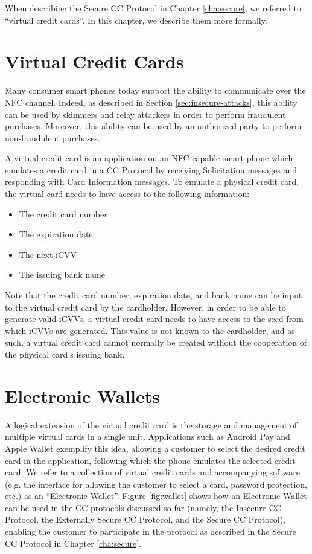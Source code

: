 When describing the Secure CC Protocol in Chapter \ref{cha:secure}, we referred to ``virtual credit cards''.
In this chapter, we describe them more formally.

\section{Virtual Credit Cards}

Many consumer smart phones today support the ability to communicate over the NFC channel.
Indeed, as described in Section \ref{sec:insecure-attacks}, this ability can be used by skimmers and relay attackers in order to perform fraudulent purchases.
Moreover, this ability can be used by an authorized party to perform non-fraudulent purchases.

A virtual credit card is an application on an NFC-capable smart phone which emulates a credit card in a CC Protocol
    by receiving Solicitation messages and responding with Card Information messages.
To emulate a physical credit card, the virtual card needs to have access to the following information:

\begin{itemize}
\item The credit card number
\item The expiration date
\item The next iCVV
\item The issuing bank name
\end{itemize}

Note that the credit card number, expiration date, and bank name can be input to the virtual credit card by the cardholder.
However, in order to be able to generate valid iCVVs, a virtual credit card needs to have access to the seed from which iCVVs are generated.
This value is not known to the cardholder, and as such, a virtual credit card cannot normally be created without the cooperation of the physical card's issuing bank.


\section{Electronic Wallets}
A logical extension of the virtual credit card is the storage and management of multiple virtual cards in a single unit.
Applications such as Android Pay and Apple Wallet exemplify this idea,
    allowing a customer to select the desired credit card in the application,
    following which the phone emulates the selected credit card.
We refer to a collection of virtual credit cards and accompanying software
    (e.g. the interface for allowing the customer to select a card, password protection, etc.) as an ``Electronic Wallet''.
Figure \ref{fig:wallet} shows how an Electronic Wallet can be used in the CC protocols discussed so far
    (namely, the Insecure CC Protocol, the Externally Secure CC Protocol, and the Secure CC Protocol),
    enabling the customer to participate in the protocol as described in the Secure CC Protocol in Chapter \ref{cha:secure}.

